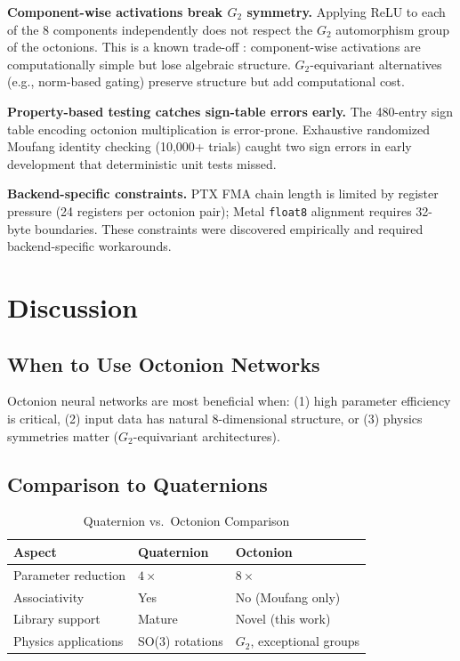 \documentclass[11pt,a4paper]{article}
\begin{document}
\textbf{Component-wise activations break $G_2$ symmetry.} Applying ReLU to each of the 8 components independently does not respect the $G_2$ automorphism group of the octonions. This is a known trade-off \cite{wu2020}: component-wise activations are computationally simple but lose algebraic structure. $G_2$-equivariant alternatives (e.g., norm-based gating) preserve structure but add computational cost.

\textbf{Property-based testing catches sign-table errors early.} The 480-entry sign table encoding octonion multiplication is error-prone. Exhaustive randomized Moufang identity checking (10{,}000+ trials) caught two sign errors in early development that deterministic unit tests missed.

\textbf{Backend-specific constraints.} PTX FMA chain length is limited by register pressure (24 registers per octonion pair); Metal \texttt{float8} alignment requires 32-byte boundaries. These constraints were discovered empirically and required backend-specific workarounds.

\section{Discussion}
\label{sec:discussion}

\subsection{When to Use Octonion Networks}

Octonion neural networks are most beneficial when: (1) high parameter efficiency is critical, (2) input data has natural 8-dimensional structure, or (3) physics symmetries matter ($G_2$-equivariant architectures).

\subsection{Comparison to Quaternions}

\begin{table}[h]
\centering
\caption{Quaternion vs.\ Octonion Comparison}
\begin{tabular}{@{}lll@{}}
\toprule
Aspect & Quaternion & Octonion \\
\midrule
Parameter reduction & $4\times$ & $8\times$ \\
Associativity & Yes & No (Moufang only) \\
Library support & Mature & Novel (this work) \\
Physics applications & SO(3) rotations & $G_2$, exceptional groups \\
\bottomrule
\end{tabular}
\end{table}
\end{document}
